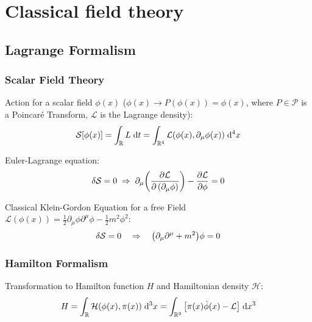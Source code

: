 \section{Classical field theory}
	\subsection{Lagrange Formalism}
		\subsubsection{Scalar Field Theory}
			\noindent 
			Action for a scalar field $\phi(x)$ (\ie $\phi(x)\rightarrow P(\phi(x))=\phi(x)$, where $P\in\mathcal{P}$ is a Poincaré Transform, $\mathcal{L}$ is the Lagrange density):
			\begin{equation}
				\mathcal{S}\qty[\phi(x)] = \int_{\mathbb{R}} L \;\dd t = \int_{\mathbb{R}^4} \mathcal{L}(\phi(x),\partial_\mu \phi(x)) \;\dd^4 x				
			\end{equation}
			
			\noindent
			Euler-Lagrange equation:
			\begin{equation}
				\delta\mathcal{S} = 0
				\;\Rightarrow\; \partial_\mu \qty(\pdv{\mathcal{L}}{\left(\partial_\mu \phi\right)}) - \pdv{\mathcal{L}}{\phi} = 0
			\end{equation}
			
			\noindent
			Classical Klein-Gordon Equation for a free Field $\mathcal{L}(\phi(x)) = \frac{1}{2} \partial_\mu\phi \partial^\mu\phi - \frac{1}{2}m^2\phi^2$:
			\begin{equation}
				\delta \mathcal{S} = 0 \quad \Rightarrow \quad \qty(\partial_\mu \partial^\mu + m^2)\phi = 0
			\end{equation}


		\subsubsection{Hamilton Formalism}
			\noindent
			Transformation to Hamilton function $H$ and Hamiltonian density $\mathcal{H}$:
			\begin{equation}
				H = \int_{\mathbb{R}} \mathcal{H}(\phi(x),\pi(x)) \;\dd^3 x = \int_{\mathbb{R}^3} \qty[\pi(x)\dot{\phi}(x) - \mathcal{L}] \;\dd x^3
			\end{equation}


